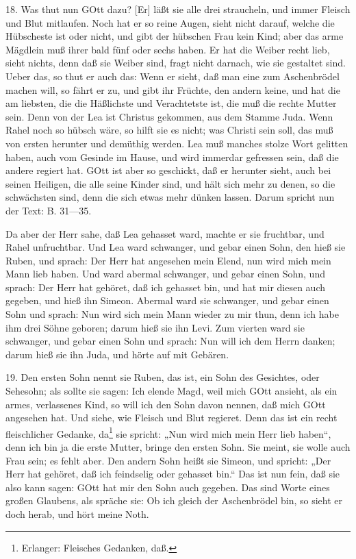 18. Was thut nun GOtt dazu? [Er] läßt sie alle drei straucheln, und immer Fleisch und Blut mitlaufen. Noch hat er so reine Augen, sieht nicht darauf, welche die Hübscheste ist oder nicht, und gibt der hübschen Frau kein Kind; aber das arme Mägdlein muß ihrer bald fünf oder sechs haben. Er hat die Weiber recht lieb, sieht nichts, denn daß sie Weiber sind, fragt nicht darnach, wie sie gestaltet sind. Ueber das, so thut er auch das: Wenn er sieht, daß man eine zum Aschenbrödel machen will, so fährt er zu, und gibt ihr Früchte, den andern keine, und hat die am liebsten, die die Häßlichste und Verachtetste ist, die muß die rechte Mutter sein. Denn von der Lea ist Christus gekommen, aus dem Stamme Juda. Wenn Rahel noch so hübsch wäre, so hilft sie es nicht; was Christi sein soll, das muß von ersten herunter und demüthig werden. Lea muß manches stolze Wort gelitten haben, auch vom Gesinde im Hause, und wird immerdar gefressen sein, daß die andere regiert hat. GOtt ist aber so geschickt, daß er herunter sieht, auch bei seinen Heiligen, die alle seine Kinder sind, und hält sich mehr zu denen, so die schwächsten sind, denn die sich etwas mehr dünken lassen. Darum spricht nun der Text:
B. 31—35.

Da aber der Herr sahe, daß Lea gehasset ward, machte er sie fruchtbar, und Rahel unfruchtbar. Und Lea ward schwanger, und gebar einen Sohn, den hieß sie Ruben, und sprach: Der Herr hat angesehen mein Elend, nun wird mich mein Mann lieb haben. Und ward abermal schwanger, und gebar einen Sohn, und sprach: Der Herr hat gehöret, daß ich gehasset bin, und hat mir diesen auch gegeben, und hieß ihn Simeon. Abermal ward sie schwanger, und gebar einen Sohn und sprach: Nun wird sich mein Mann wieder zu mir thun, denn ich habe ihm drei Söhne geboren; darum hieß sie ihn Levi. Zum vierten ward sie schwanger, und gebar einen Sohn und sprach: Nun will ich dem Herrn danken; darum hieß sie ihn Juda, und hörte auf mit Gebären.

19. Den ersten Sohn nennt sie Ruben, das ist, ein Sohn des Gesichtes, oder Sehesohn; als sollte sie sagen: Ich elende Magd, weil mich GOtt ansieht, als ein armes, verlassenes Kind, so will ich den Sohn davon nennen, daß mich GOtt angesehen hat. Und siehe, wie Fleisch und Blut regieret. Denn das ist ein recht fleischlicher Gedanke, da\footnote{Erlanger: Fleisches Gedanken, daß.} sie spricht: „Nun wird mich mein Herr lieb haben“, denn ich bin ja die erste Mutter, bringe den ersten Sohn. Sie meint, sie wolle auch Frau sein; es fehlt aber. Den andern Sohn heißt sie Simeon, und spricht: „Der Herr hat gehöret, daß ich feindselig oder gehasset bin.“ Das ist nun fein, daß sie also kann sagen: GOtt hat mir den Sohn auch gegeben. Das sind Worte eines großen Glaubens, als spräche sie: Ob ich gleich der Aschenbrödel bin, so sieht er doch herab, und hört meine Noth.

